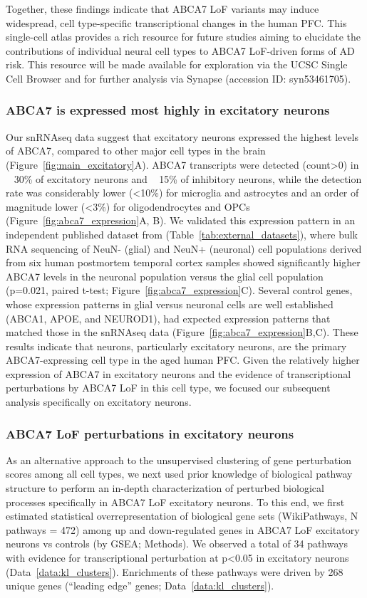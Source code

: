 Together, these findings indicate that ABCA7 LoF variants may induce widespread, cell type-specific transcriptional changes in the human PFC. This single-cell atlas provides a rich resource for future studies aiming to elucidate the contributions of individual neural cell types to ABCA7 LoF-driven forms of AD risk. This resource will be made available for exploration via the UCSC Single Cell Browser and for further analysis via Synapse (accession ID: syn53461705).

\subsubsection{ABCA7 is expressed most highly in excitatory neurons}
Our snRNAseq data suggest that excitatory neurons expressed the highest levels of ABCA7, compared to other major cell types in the brain (Figure~\ref{fig:main_excitatory}A).  ABCA7 transcripts were detected (count>0) in ~ 30\% of excitatory neurons and ~ 15\% of inhibitory neurons, while the detection rate was considerably lower (<10\%) for microglia and astrocytes and an order of magnitude lower (<3\%) for oligodendrocytes and OPCs (Figure~\ref{fig:abca7_expression}A, B). We validated this expression pattern in an independent published dataset from\cite{Welch2022-ef} (Table~\ref{tab:external_datasets}), where bulk RNA sequencing of NeuN- (glial) and NeuN+ (neuronal) cell populations derived from six human postmortem temporal cortex samples showed significantly higher ABCA7 levels in the neuronal population versus the glial cell population (p=0.021, paired t-test; Figure~\ref{fig:abca7_expression}C). Several control genes, whose expression patterns in glial versus neuronal cells are well established (ABCA1, APOE, and NEUROD1), had expected expression patterns that matched those in the snRNAseq data (Figure~\ref{fig:abca7_expression}B,C). These results indicate that neurons, particularly excitatory neurons, are the primary ABCA7-expressing cell type in the aged human PFC. Given the relatively higher expression of ABCA7 in excitatory neurons and the evidence of transcriptional perturbations by ABCA7 LoF in this cell type, we focused our subsequent analysis specifically on excitatory neurons.

\subsubsection{ABCA7 LoF perturbations in excitatory neurons}
As an alternative approach to the unsupervised clustering of gene perturbation scores among all cell types, we next used prior knowledge of biological pathway structure to perform an in-depth characterization of perturbed biological processes specifically in ABCA7 LoF excitatory neurons. To this end, we first estimated statistical overrepresentation of biological gene sets (WikiPathways, N pathways = 472) among up and down-regulated genes in ABCA7 LoF excitatory neurons vs controls (by GSEA; Methods). We observed a total of 34 pathways with evidence for transcriptional perturbation at p<0.05 in excitatory neurons (Data~\ref{data:kl_clusters}). Enrichments of these pathways were driven by 268 unique genes (“leading edge” genes\cite{Subramanian2005-pu}; Data~\ref{data:kl_clusters}).   

